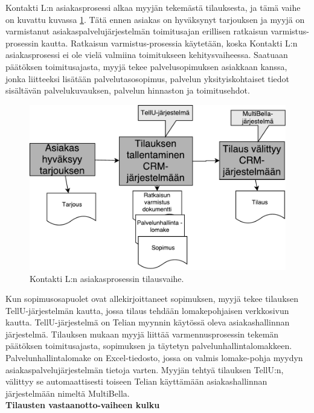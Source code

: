 \documentclass[finnish,12pt,a4paper,pdftex]{article}
\begin{document}
\noindent Kontakti L:n asiakasprosessi alkaa myyjän tekemästä tilauksesta, ja tämä vaihe on kuvattu kuvassa \ref{fig:tilaus}. Tätä ennen asiakas on hyväksynyt tarjouksen ja myyjä on varmistanut asiakaspalvelujärjestelmän toimitusajan erillisen ratkaisun varmistus-prosessin kautta. Ratkaisun varmistus-prosessia käytetään, koska Kontakti L:n asiakasprosessi ei ole vielä valmiina toimitukseen kehitysvaiheessa. Saatuaan päätöksen toimitusajasta, myyjä tekee palvelusopimuksen asiakkaan kanssa, jonka liitteeksi lisätään palvelutasosopimus, palvelun yksityiskohtaiset tiedot sisältävän palvelukuvauksen, palvelun hinnaston ja toimitusehdot.

\begin{figure}[!h]
    \centering
    \includegraphics[scale=0.4]{images/tilaus.pdf}
    \caption{Kontakti L:n asiakasprosessin tilausvaihe.}
    \label{fig:tilaus}
\end{figure}

\noindent Kun sopimusosapuolet ovat allekirjoittaneet sopimuksen, myyjä tekee tilauksen TellU-järjestelmän kautta, jossa tilaus tehdään lomakepohjaisen verkkosivun kautta. TellU-järjestelmä on Telian myynnin käytössä oleva asiakashallinnan järjestelmä. Tilauksen mukaan myyjä liittää varmennusprosessin tekemän päätöksen toimitusajasta, sopimuksen ja täytetyn palvelunhallintalomakkeen. Palvelunhallintalomake on Excel-tiedosto, jossa on valmis lomake-pohja myydyn asiakaspalvelujärjestelmän tietoja varten. Myyjän tehtyä tilauksen TellU:n, välittyy se automaattisesti toiseen Telian käyttämään asiakashallinnan järjestelmään nimeltä MultiBella.\\

\textbf{Tilausten vastaanotto-vaiheen kulku}\\
\end{document}
